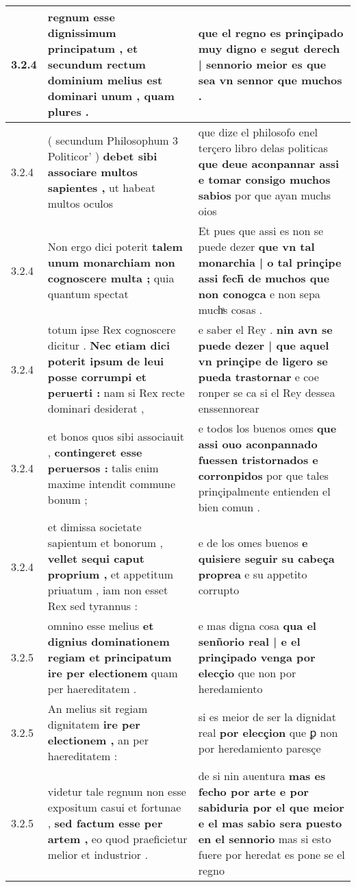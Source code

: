 \begin{tabular}{|p{1cm}|p{6.5cm}|p{6.5cm}|}
3.2.4 & regnum esse dignissimum principatum , \textbf{ et secundum rectum dominium melius est dominari unum , } quam plures . & que el regno es prinçipado muy digno \textbf{ e segut derech | sennorio meior es } que sea vn sennor que muchos . \\\hline
3.2.4 & ( secundum Philosophum 3 Politicor’ ) \textbf{ debet sibi associare multos sapientes , } ut habeat multos oculos & que dize el philosofo enel terçero libro delas politicas \textbf{ que deue aconpannar assi e tomar consigo muchos sabios } por que ayan muchs oios \\\hline
3.2.4 & Non ergo dici poterit \textbf{ talem unum monarchiam non cognoscere multa ; } quia quantum spectat & Et pues que assi es non se puede dezer \textbf{ que vn tal monarchia | o tal prinçipe assi fech̃ de muchos que non conogca } e non sepa muchͣs cosas . \\\hline
3.2.4 & totum ipse Rex cognoscere dicitur . \textbf{ Nec etiam dici poterit ipsum de leui posse corrumpi et peruerti : } nam si Rex recte dominari desiderat , & e saber el Rey . \textbf{ nin avn se puede dezer | que aquel vn prinçipe de ligero se pueda trastornar } e coe ronper se ca si el Rey dessea enssennorear \\\hline
3.2.4 & et bonos quos sibi associauit , \textbf{ contingeret esse peruersos : } talis enim maxime intendit commune bonum ; & e todos los buenos omes \textbf{ que assi ouo aconpannado fuessen tristornados e corronpidos } por que tales prinçipalmente entienden el bien comun . \\\hline
3.2.4 & et dimissa societate sapientum et bonorum , \textbf{ vellet sequi caput proprium , } et appetitum priuatum , iam non esset Rex sed tyrannus : & e de los omes buenos \textbf{ e quisiere seguir su cabeça proprea } e su appetito corrupto \\\hline
3.2.5 & omnino esse melius \textbf{ et dignius dominationem regiam et principatum ire per electionem } quam per haereditatem . & e mas digna cosa \textbf{ qua el senñorio real | e el prinçipado venga por elecçio } que non por heredamiento \\\hline
3.2.5 & An melius sit regiam dignitatem \textbf{ ire per electionem , } an per haereditatem : & si es meior de ser la dignidat real \textbf{ por elecçion } que ꝑ non por heredamiento paresçe \\\hline
3.2.5 & videtur tale regnum non esse expositum casui et fortunae , \textbf{ sed factum esse per artem , } eo quod praeficietur melior et industrior . & de si nin auentura \textbf{ mas es fecho por arte e por sabiduria por el que meior e el mas sabio sera puesto en el sennorio } mas si esto fuere por heredat es pone se el regno \\\hline

\end{tabular}
